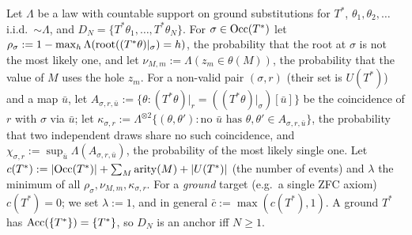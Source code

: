 Let $\Lambda$ be a law with countable support on ground substitutions for $T^*$, $\theta_1,\theta_2,\dots$ i.i.d.\ $\sim\Lambda$, and $D_N=\{T^*\theta_1,\dots,T^*\theta_N\}$. For $\sigma\in\mathrm{Occ}(T^*)$ let $\rho_\sigma:=1-\max_h\Lambda(\mathrm{root}((T^*\theta)|_\sigma)=h)$, the probability that the root at $\sigma$ is not the most likely one, and let $\nu_{M,m}:=\Lambda(z_m\in\theta(M))$, the probability that the value of $M$ uses the hole $z_m$. For a non-valid pair $(\sigma,r)$ (their set is $U(T^*)$) and a map $\bar u$, let $A_{\sigma,r,\bar u}:=\{\theta:(T^*\theta)|_r=((T^*\theta)|_\sigma)[\bar u]\}$ be the coincidence of $r$ with $\sigma$ via $\bar u$; let $\kappa_{\sigma,r}:=\Lambda^{\otimes2}\{(\theta,\theta'):\text{no }\bar u\text{ has }\theta,\theta'\in A_{\sigma,r,\bar u}\}$, the probability that two independent draws share no such coincidence, and $\chi_{\sigma,r}:=\sup_{\bar u}\Lambda(A_{\sigma,r,\bar u})$, the probability of the most likely single one. Let $c(T^*):=|\mathrm{Occ}(T^*)|+\sum_M\mathrm{arity}(M)+|U(T^*)|$ (the number of events) and $\lambda$ the minimum of all $\rho_\sigma,\nu_{M,m},\kappa_{\sigma,r}$. For a \emph{ground} target (e.g.\ a single ZFC axiom) $c(T^*)=0$; we set $\lambda:=1$, and in general $\bar c:=\max(c(T^*),1)$. A ground $T^*$ has $\mathrm{Acc}(\{T^*\})=\{T^*\}$, so $D_N$ is an anchor iff $N\ge1$.

